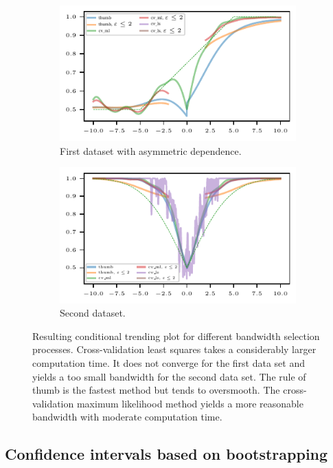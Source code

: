\begin{figure}
    \centering
    \begin{subfigure}{.48\textwidth}
        \includegraphics{plots/illustrative_examples/cond_prob_plot_bw_asym_butterfly}
        \caption{First dataset with asymmetric dependence.}
    \end{subfigure}
    \begin{subfigure}{.48\textwidth}
        \includegraphics{plots/illustrative_examples/cond_prob_plot_bw_normal}
        \caption{Second dataset. }
    \end{subfigure}
    \caption{Resulting conditional trending plot for different bandwidth selection processes. Cross-validation least squares takes a considerably larger computation time. It does not converge for the first data set and yields a too small bandwidth for the second data set. The rule of thumb is the fastest method but tends to oversmooth. The cross-validation maximum likelihood method yields a more reasonable bandwidth with moderate computation time. }\label{fig:trending-cond-prob-bw}
\end{figure}


\subsection{Confidence intervals based on bootstrapping}\label{subsec:trending-bootstrap}

